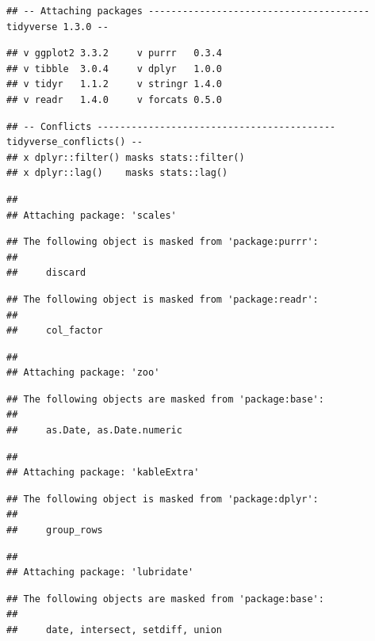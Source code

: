 \documentclass[
]{article}
\author{}
\date{\vspace{-2.5em}}
\begin{document}
\begin{verbatim}
## -- Attaching packages --------------------------------------- tidyverse 1.3.0 --
\end{verbatim}

\begin{verbatim}
## v ggplot2 3.3.2     v purrr   0.3.4
## v tibble  3.0.4     v dplyr   1.0.0
## v tidyr   1.1.2     v stringr 1.4.0
## v readr   1.4.0     v forcats 0.5.0
\end{verbatim}

\begin{verbatim}
## -- Conflicts ------------------------------------------ tidyverse_conflicts() --
## x dplyr::filter() masks stats::filter()
## x dplyr::lag()    masks stats::lag()
\end{verbatim}

\begin{verbatim}
## 
## Attaching package: 'scales'
\end{verbatim}

\begin{verbatim}
## The following object is masked from 'package:purrr':
## 
##     discard
\end{verbatim}

\begin{verbatim}
## The following object is masked from 'package:readr':
## 
##     col_factor
\end{verbatim}

\begin{verbatim}
## 
## Attaching package: 'zoo'
\end{verbatim}

\begin{verbatim}
## The following objects are masked from 'package:base':
## 
##     as.Date, as.Date.numeric
\end{verbatim}

\begin{verbatim}
## 
## Attaching package: 'kableExtra'
\end{verbatim}

\begin{verbatim}
## The following object is masked from 'package:dplyr':
## 
##     group_rows
\end{verbatim}

\begin{verbatim}
## 
## Attaching package: 'lubridate'
\end{verbatim}

\begin{verbatim}
## The following objects are masked from 'package:base':
## 
##     date, intersect, setdiff, union
\end{verbatim}
\end{document}
